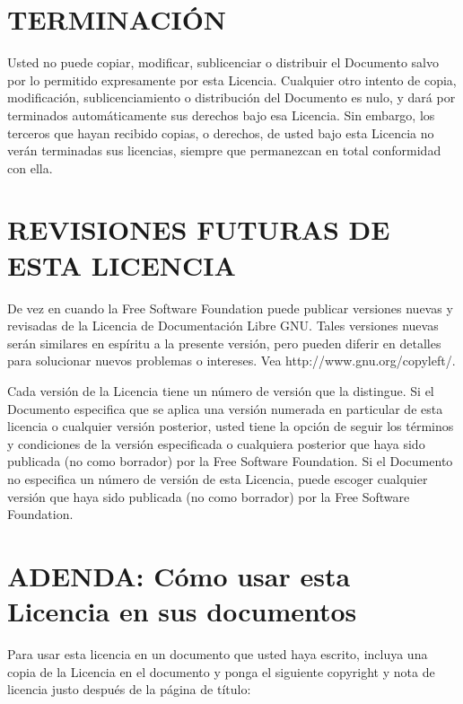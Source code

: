 \documentclass[letterpaper,12pt,titlepage]{article}
\begin{document}
\section{TERMINACIÓN}

Usted no puede copiar, modificar, sublicenciar o distribuir el Documento salvo por lo permitido expresamente por esta Licencia. Cualquier otro intento de copia, modificación, sublicenciamiento o distribución del Documento es nulo, y dará por terminados automáticamente sus derechos bajo esa Licencia. Sin embargo, los terceros que hayan recibido copias, o derechos, de usted bajo esta Licencia no verán terminadas sus licencias, siempre que permanezcan en total conformidad con ella.\par

\section{REVISIONES FUTURAS DE ESTA LICENCIA}

De vez en cuando la Free Software Foundation puede publicar versiones nuevas y revisadas de la Licencia de Documentación Libre GNU. Tales versiones nuevas serán similares en espíritu a la presente versión, pero pueden diferir en detalles para solucionar nuevos problemas o intereses. Vea http://www.gnu.org/copyleft/.\par

Cada versión de la Licencia tiene un número de versión que la distingue. Si el Documento especifica que se aplica una versión numerada en particular de esta licencia o cualquier versión posterior, usted tiene la opción de seguir los términos y condiciones de la versión especificada o cualquiera posterior que haya sido publicada (no como borrador) por la Free Software Foundation. Si el Documento no especifica un número de versión de esta Licencia, puede escoger cualquier versión que haya sido publicada (no como borrador) por la Free Software Foundation.\par

\section{ADENDA: Cómo usar esta Licencia en sus documentos}

Para usar esta licencia en un documento que usted haya escrito, incluya una copia de la Licencia en el documento y ponga el siguiente copyright y nota de licencia justo después de la página de título:\par
\end{document}
